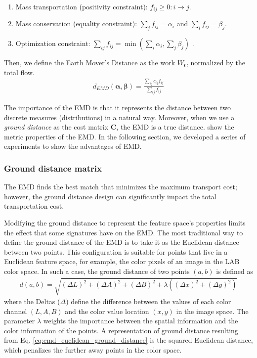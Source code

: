 \begin{enumerate}%
 \item Mass transportation (positivity constraint): $f_{ij} \geq 0 : i\rightarrow j$.
 \item Mass conservation (equality constraint):  $\sum_{j}f_{ij}=\alpha_i$ and $\sum_{i}f_{ij}= \beta_j$.
 \item Optimization constraint: $\sum_{ij}f_{ij} = \min \left( \sum_{i}\alpha_i, \sum_{j}\beta_j \right)$ .
\end{enumerate}  

Then, we define the Earth Mover's Distance as the work $W_{\mathbf{C}}$ normalized by the total flow.
\begin{eqnarray}
d_{EMD}(\boldsymbol{\alpha}, \boldsymbol{\beta}) = \frac{\sum_{ij}c_{ij}f_{ij}}{\sum_{ij}f_{ij}}
\label{eq:emd}
\end{eqnarray}

The importance of the EMD is that it represents the distance between two discrete measures (distributions) in a natural way. Moreover, when we use a \textit{ground distance} as the cost matrix $\mathbf{C}$, the EMD is a true distance. \cite{Peyre.Cuturi:arXiv:2018} show the metric properties of the EMD. In the following section, we developed a series of experiments to show the advantages of EMD. 

\subsubsection{Ground distance matrix}
The EMD finds the best match that minimizes the maximum transport cost; however, the ground distance design can significantly impact the total transportation cost.

Modifying the ground distance to represent the feature space's properties limits the effect that some signatures have on the EMD. The most traditional way to define the ground distance of the EMD is to take it as the Euclidean distance between two points. This configuration is suitable for points that live in a Euclidean feature space, for example, the color pixels of an image in the LAB color space. In such a case, the ground distance of two points $(a,b)$ is defined as
\begin{eqnarray} \label{eq:emd_euclidean_ground_distance}
	d(a, b) = \sqrt{(\Delta L)^2 + (\Delta A)^2 + (\Delta B)^2 + \lambda((\Delta x)^2 +(\Delta y)^2) } 	
\end{eqnarray}
where the Deltas ($\Delta$) define the difference between the values of each color channel $(L, A, B)$ and the color value location $(x,y)$ in the image space. The parameter $\lambda$ weights the importance between the spatial information and the color information of the points. A representation of ground distance resulting from Eq. \eqref{eq:emd_euclidean_ground_distance} is the squared Euclidean distance, which penalizes the further away points in the color space.


